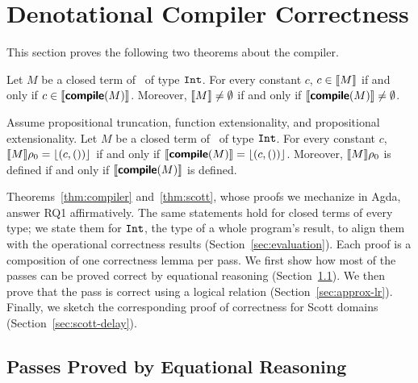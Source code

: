 
\section{Denotational Compiler Correctness}
\label{sec:compiler-proof}

This section proves the following two theorems about the \fpc{}
compiler.

\begin{theorem}\label{thm:compiler}
Let $M$ be a closed term of \fpc\ of type $\mathtt{Int}$. For every constant $c$,
$c \in \llbracket M \rrbracket$ if and only if $c \in \llbracket \textsf{\bfseries compile}(M) \rrbracket$.
Moreover, $\llbracket M \rrbracket \neq \emptyset$ if and only if
$\llbracket \textsf{\bfseries compile}(M) \rrbracket \neq \emptyset$.
\end{theorem}

\begin{theorem}\label{thm:scott}
Assume propositional truncation, function extensionality, and
propositional extensionality. Let $M$ be a closed term of \fpc\ of
type $\mathtt{Int}$. For every constant $c$,
$\llbracket M \rrbracket\rho_0 = \lfloor (c, ()) \rfloor$ if and only if
$\llbracket \textsf{\bfseries compile}(M) \rrbracket = \lfloor (c, ()) \rfloor$. Moreover, $\llbracket M \rrbracket\rho_0$ is
defined if and only if $\llbracket \textsf{\bfseries compile}(M) \rrbracket$ is defined.
\end{theorem}

Theorems~\ref{thm:compiler} and~\ref{thm:scott}, whose proofs we
mechanize in Agda, answer RQ1 affirmatively. The same statements hold
for closed terms of every type; we state them for $\mathtt{Int}$, the type
of a whole program's result, to align them with the operational
correctness results (Section~\ref{sec:evaluation}). Each proof is a
composition of one correctness lemma per pass.  We first show how most
of the passes can be proved correct by equational reasoning
(Section~\ref{sec:equational}). We then prove that the  pass is correct using a logical relation
(Section~\ref{sec:approx-lr}). Finally, we sketch the corresponding
proof of correctness for Scott domains
(Section~\ref{sec:scott-delay}).

\subsection{Passes Proved by Equational Reasoning}
\label{sec:equational}

